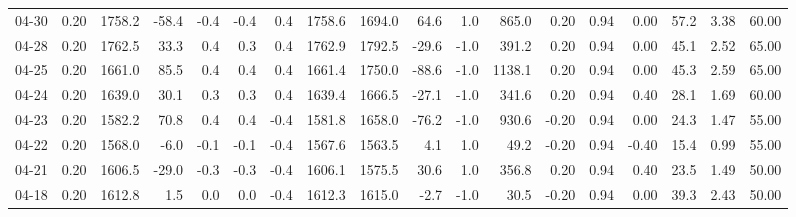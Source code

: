 \begin{threeparttable}
{\begin{tabular}{lrrrrrrrrrrrrrrrrr}
  04-30 &     0.20 & 1758.2 &             -58.4 &              -0.4 &               -0.4 &                0.4 & 1758.6 & 1694.0 &       64.6 &                      1.0 &               865.0 &       0.20 &      0.94 &           0.00 &             57.2 &            3.38 &                  60.00 \\
  04-28 &     0.20 & 1762.5 &              33.3 &               0.4 &                0.3 &                0.4 & 1762.9 & 1792.5 &      -29.6 &                     -1.0 &               391.2 &       0.20 &      0.94 &           0.00 &             45.1 &            2.52 &                  65.00 \\
  04-25 &     0.20 & 1661.0 &              85.5 &               0.4 &                0.4 &                0.4 & 1661.4 & 1750.0 &      -88.6 &                     -1.0 &              1138.1 &       0.20 &      0.94 &           0.00 &             45.3 &            2.59 &                  65.00 \\
  04-24 &     0.20 & 1639.0 &              30.1 &               0.3 &                0.3 &                0.4 & 1639.4 & 1666.5 &      -27.1 &                     -1.0 &               341.6 &       0.20 &      0.94 &           0.40 &             28.1 &            1.69 &                  60.00 \\
  04-23 &     0.20 & 1582.2 &              70.8 &               0.4 &                0.4 &               -0.4 & 1581.8 & 1658.0 &      -76.2 &                     -1.0 &               930.6 &      -0.20 &      0.94 &           0.00 &             24.3 &            1.47 &                  55.00 \\
  04-22 &     0.20 & 1568.0 &              -6.0 &              -0.1 &               -0.1 &               -0.4 & 1567.6 & 1563.5 &        4.1 &                      1.0 &                49.2 &      -0.20 &      0.94 &          -0.40 &             15.4 &            0.99 &                  55.00 \\
  04-21 &     0.20 & 1606.5 &             -29.0 &              -0.3 &               -0.3 &               -0.4 & 1606.1 & 1575.5 &       30.6 &                      1.0 &               356.8 &       0.20 &      0.94 &           0.40 &             23.5 &            1.49 &                  50.00 \\
  04-18 &     0.20 & 1612.8 &               1.5 &               0.0 &                0.0 &               -0.4 & 1612.3 & 1615.0 &       -2.7 &                     -1.0 &                30.5 &      -0.20 &      0.94 &           0.00 &             39.3 &            2.43 &                  50.00 \\

\end{tabular}}
\end{threeparttable}
